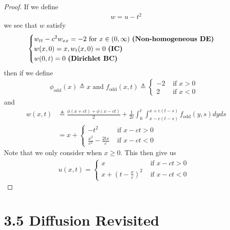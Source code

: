 \documentclass{report}
\begin{document}
\begin{proof}
If we define 
\begin{align*}
w=u-t^2
\end{align*}
we see that $w$ satisfy 
\begin{align*}
\begin{cases}
  w_{tt}-c^2w_{xx}=-2\text{ for }x\in (0,\infty)\text{ \textbf{(Non-homogeneous DE)} } \\
  w(x,0)=x,w_t(x,0)=0\text{ \textbf{(IC)} }\\
  w(0,t)=0\text{ \textbf{(Dirichlet BC)} }
\end{cases}
\end{align*}
then if we define 
\begin{align*}
\phi_{\operatorname{odd}}(x)\triangleq x\text{ and }f_{\operatorname{odd}}(x,t)\triangleq \begin{cases}
  -2& \text{ if $x>0$ }\\
  2& \text{ if $x<0$ }
\end{cases} 
\end{align*}
and 
\begin{align*}
  w(x,t)&\triangleq  \frac{\phi (x+ct)+ \phi (x-ct)}{2} + \frac{1}{2c}\int_0^t \int^{x+c(t-s)}_{x-c(t-s)} f_{\operatorname{odd}}(y,s)dyds  \\
  &= x+  \begin{cases}
   -t^2& \text{ if $x-ct>0$ }\\
    \frac{x^2}{c^2}-\frac{2tx}{c}& \text{ if $x-ct<0$ }
  \end{cases}
\end{align*}
Note that we only consider when $x\geq 0$. This then give us 
\begin{align*}
u(x,t)= \begin{cases}
  x &\text{ if $x-ct>0$ }\\
  x+ (t-\frac{x}{c})^2 &\text{ if $x-ct<0$ }
\end{cases}
\end{align*}
\end{proof}
\section{3.5 Diffusion Revisited}
\end{document}
